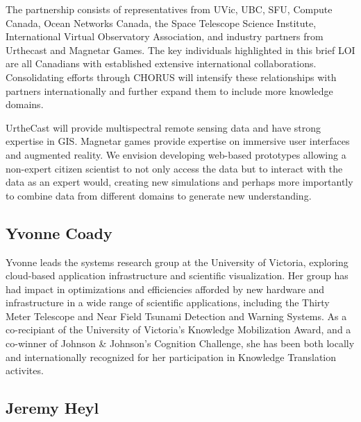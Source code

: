 



The partnership consists of representatives from UVic, UBC, SFU,
Compute Canada, Ocean Networks Canada, the Space Telescope Science
Institute, International Virtual Observatory Association, and industry
partners from Urthecast and Magnetar Games.  The key individuals highlighted in this brief LOI are all Canadians with established extensive international collaborations.  Consolidating efforts through CHORUS will intensify these relationships with partners internationally and further expand them to include more knowledge domains.

UrtheCast will provide multispectral remote sensing data and have strong expertise in GIS.
Magnetar games provide expertise on immersive user interfaces and
augmented reality.  We envision developing web-based prototypes
allowing a non-expert citizen scientist to not only access the data
but to interact with the data as an expert would, creating new
simulations and perhaps more importantly to combine data from
different domains to generate new understanding.

\subsection*{Yvonne Coady} 
Yvonne leads the systems research group at the University of Victoria, exploring cloud-based application infrastructure and scientific visualization.  Her group has had impact in optimizations and efficiencies afforded by new hardware and infrastructure in a wide range of scientific applications, including the Thirty Meter Telescope and Near Field Tsunami Detection and Warning Systems.  As a co-recipiant of the University of Victoria's Knowledge Mobilization Award, and a co-winner of Johnson & Johnson's Cognition Challenge, she has been both locally and internationally recognized for her participation in Knowledge Translation activites.


\subsection*{Jeremy Heyl}

